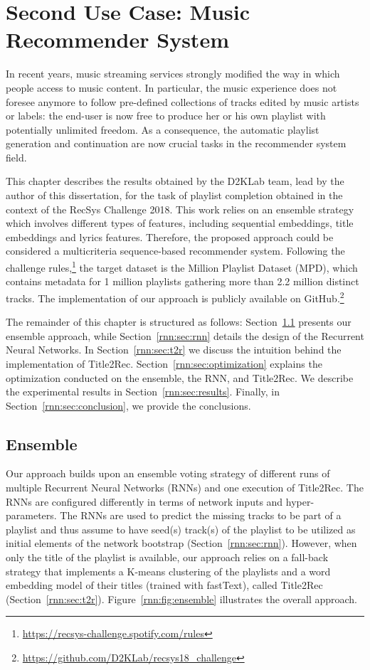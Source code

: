 \chapter{Second Use Case: Music Recommender System}
\graphicspath{{Chapter09/Figures/}}
\label{chap:challenge}

In recent years, music streaming services strongly modified the way in which people access to music content. In particular, the music experience does not foresee anymore to follow pre-defined collections of tracks edited by music artists or labels: the end-user is now free to produce her or his own playlist with potentially unlimited freedom. As a consequence, the automatic playlist generation and continuation are now crucial tasks in the recommender system field.

This chapter describes the results obtained by the D2KLab team, lead by the author of this dissertation, for the task of playlist completion obtained in the context of the RecSys Challenge 2018. This work relies on an ensemble strategy which involves different types of features, including sequential embeddings, title embeddings and lyrics features. Therefore, the proposed approach could be considered a multicriteria sequence-based recommender system. Following the challenge rules,\footnote{\url{https://recsys-challenge.spotify.com/rules}} the target dataset is the Million Playlist Dataset (MPD), which contains metadata for 1 million playlists gathering more than 2.2 million distinct tracks. The implementation of our approach is publicly available on GitHub.\footnote{\url{https://github.com/D2KLab/recsys18_challenge}}

The remainder of this chapter is structured as follows: Section~\ref{rnn:sec:ensemble} presents our ensemble approach, while Section~\ref{rnn:sec:rnn} details the design of the Recurrent Neural Networks. In Section~\ref{rnn:sec:t2r} we discuss the intuition behind the implementation of Title2Rec. Section~\ref{rnn:sec:optimization} explains the optimization conducted on the ensemble, the RNN, and Title2Rec. We describe the experimental results in Section~\ref{rnn:sec:results}. Finally, in Section~\ref{rnn:sec:conclusion}, we provide the conclusions.

\section{Ensemble}
\label{rnn:sec:ensemble}

Our approach builds upon an ensemble voting strategy of different runs of multiple Recurrent Neural Networks (RNNs) and one execution of Title2Rec. The RNNs are configured differently in terms of network inputs and hyper-parameters. The RNNs are used to predict the missing tracks to be part of a playlist and thus assume to have seed(s) track(s) of the playlist to be utilized as initial elements of the network bootstrap (Section~\ref{rnn:sec:rnn}). However, when only the title of the playlist is available, our approach relies on a fall-back strategy that implements a K-means clustering of the playlists and a word embedding model of their titles (trained with fastText), called Title2Rec (Section~\ref{rnn:sec:t2r}). Figure~\ref{rnn:fig:ensemble} illustrates the overall approach.

